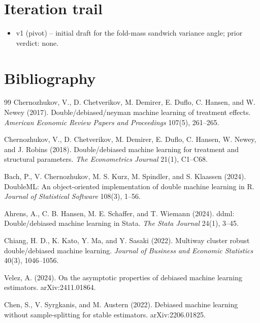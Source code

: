 \documentclass[11pt]{article}
\theoremstyle{definition}
\theoremstyle{plain}
\theoremstyle{remark}
\begin{document}
\section{Iteration trail}
\begin{itemize}[leftmargin=*]
\item v1 (pivot) -- initial draft for the fold-mass sandwich variance angle; prior verdict: none.
\end{itemize}

\section*{Bibliography}
\begin{thebibliography}{99}
Chernozhukov, V., D. Chetverikov, M. Demirer, E. Duflo, C. Hansen, and W. Newey (2017).
Double/debiased/neyman machine learning of treatment effects.
\emph{American Economic Review Papers and Proceedings} 107(5), 261--265.

Chernozhukov, V., D. Chetverikov, M. Demirer, E. Duflo, C. Hansen, W. Newey, and J. Robins (2018).
Double/debiased machine learning for treatment and structural parameters.
\emph{The Econometrics Journal} 21(1), C1--C68.

Bach, P., V. Chernozhukov, M. S. Kurz, M. Spindler, and S. Klaassen (2024).
DoubleML: An object-oriented implementation of double machine learning in R.
\emph{Journal of Statistical Software} 108(3), 1--56.

Ahrens, A., C. B. Hansen, M. E. Schaffer, and T. Wiemann (2024).
ddml: Double/debiased machine learning in Stata.
\emph{The Stata Journal} 24(1), 3--45.

Chiang, H. D., K. Kato, Y. Ma, and Y. Sasaki (2022).
Multiway cluster robust double/debiased machine learning.
\emph{Journal of Business and Economic Statistics} 40(3), 1046--1056.

Velez, A. (2024).
On the asymptotic properties of debiased machine learning estimators.
arXiv:2411.01864.

Chen, S., V. Syrgkanis, and M. Austern (2022).
Debiased machine learning without sample-splitting for stable estimators.
arXiv:2206.01825.


\end{thebibliography}
\end{document}
